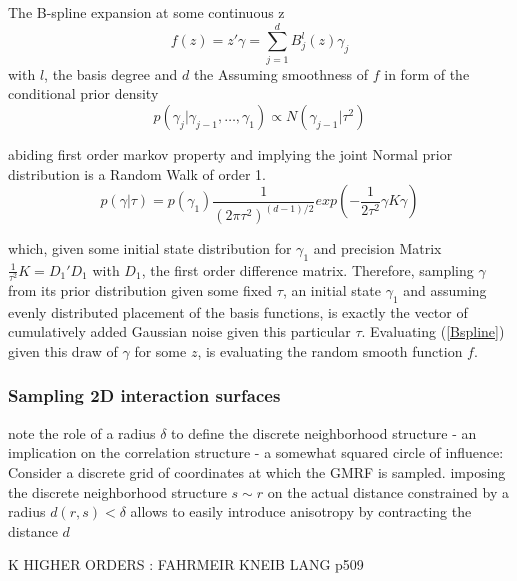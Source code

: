 \documentclass[11pt]{article}
\begin{document}
            The B-spline expansion at some continuous z
            \begin{equation} \label{Bspline}
                f(z) = z'\gamma = \sum_{j=1}^d B_j^l (z)\gamma_j
            \end{equation}
            with $l$, the basis degree and $d$ the
            Assuming smoothness of $f$ in form of the conditional prior density
            \begin{equation}
                p(\gamma_j|\gamma_{j-1}, \dots, \gamma_1) \propto N(\gamma_{j-1}|\tau^2)
            \end{equation}

            abiding first order markov property and implying the joint Normal prior distribution is a Random Walk of order 1.
            \begin{equation} \label{1dprior}
                p(\gamma|\tau) = p(\gamma_1)\frac{1}{(2\pi\tau^2)^{(d-1)/2}}exp\left( -\frac{1}{2\tau^2} \gamma K \gamma \right)
            \end{equation}

            which, given some initial state distribution for $\gamma_1$ and precision Matrix $\frac{1}{\tau^2}K = D_1'D_1$ with $D_1$, the first order difference matrix.  Therefore, sampling $\gamma$ from its prior distribution given some fixed $\tau$, an initial state $\gamma_1$ and assuming evenly distributed placement of the basis functions, is exactly the vector of cumulatively added Gaussian noise given this particular $\tau$. Evaluating (\ref{Bspline}) given this draw of $\gamma$ for some $z$, is evaluating the random smooth function $f$.



            \subsubsection{Sampling 2D interaction surfaces}

            note the role of a radius $\delta$ to define the discrete neighborhood structure - an implication on the correlation structure - a somewhat squared circle of influence: Consider a discrete grid of coordinates at which the GMRF is sampled. imposing the discrete neighborhood structure $s \sim r$ on the actual distance constrained by a radius $d(r,s)<\delta$ allows to easily introduce anisotropy by contracting the distance $d$

            K HIGHER ORDERS : FAHRMEIR KNEIB LANG p509
\end{document}
